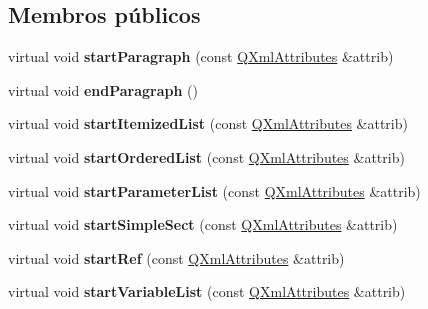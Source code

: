 \subsection*{Membros públicos}
\begin{DoxyCompactItemize}
\item 
\hypertarget{class_paragraph_handler_abb7f955561480002949ada58092c1964}{virtual void {\bfseries start\-Paragraph} (const \hyperlink{class_q_xml_attributes}{Q\-Xml\-Attributes} \&attrib)}\label{class_paragraph_handler_abb7f955561480002949ada58092c1964}

\item 
\hypertarget{class_paragraph_handler_a3076b52ebe72e4b56c232817cf2a16f0}{virtual void {\bfseries end\-Paragraph} ()}\label{class_paragraph_handler_a3076b52ebe72e4b56c232817cf2a16f0}

\item 
\hypertarget{class_paragraph_handler_a6e3b6970626df600d93059a32587663f}{virtual void {\bfseries start\-Itemized\-List} (const \hyperlink{class_q_xml_attributes}{Q\-Xml\-Attributes} \&attrib)}\label{class_paragraph_handler_a6e3b6970626df600d93059a32587663f}

\item 
\hypertarget{class_paragraph_handler_a367102893cc80ee76a6efd268fddcf50}{virtual void {\bfseries start\-Ordered\-List} (const \hyperlink{class_q_xml_attributes}{Q\-Xml\-Attributes} \&attrib)}\label{class_paragraph_handler_a367102893cc80ee76a6efd268fddcf50}

\item 
\hypertarget{class_paragraph_handler_a881264a421d5674b3464a382845354db}{virtual void {\bfseries start\-Parameter\-List} (const \hyperlink{class_q_xml_attributes}{Q\-Xml\-Attributes} \&attrib)}\label{class_paragraph_handler_a881264a421d5674b3464a382845354db}

\item 
\hypertarget{class_paragraph_handler_a5a59ce1b33a110821e15f0a4141ef9d8}{virtual void {\bfseries start\-Simple\-Sect} (const \hyperlink{class_q_xml_attributes}{Q\-Xml\-Attributes} \&attrib)}\label{class_paragraph_handler_a5a59ce1b33a110821e15f0a4141ef9d8}

\item 
\hypertarget{class_paragraph_handler_a64b60752227d7af719398c2683cb17bf}{virtual void {\bfseries start\-Ref} (const \hyperlink{class_q_xml_attributes}{Q\-Xml\-Attributes} \&attrib)}\label{class_paragraph_handler_a64b60752227d7af719398c2683cb17bf}

\item 
\hypertarget{class_paragraph_handler_a41323d0f7798eee31fff5dc7acd7b892}{virtual void {\bfseries start\-Variable\-List} (const \hyperlink{class_q_xml_attributes}{Q\-Xml\-Attributes} \&attrib)}\label{class_paragraph_handler_a41323d0f7798eee31fff5dc7acd7b892}


\end{DoxyCompactItemize}

